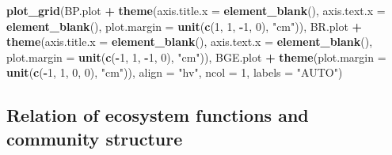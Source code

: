 \documentclass[]{article}
\newenvironment{Shaded}{\begin{snugshade}}{\end{snugshade}}
\newcommand{\KeywordTok}[1]{\textcolor[rgb]{0.13,0.29,0.53}{\textbf{#1}}}
\newcommand{\DataTypeTok}[1]{\textcolor[rgb]{0.13,0.29,0.53}{#1}}
\newcommand{\DecValTok}[1]{\textcolor[rgb]{0.00,0.00,0.81}{#1}}
\newcommand{\StringTok}[1]{\textcolor[rgb]{0.31,0.60,0.02}{#1}}
\newcommand{\OperatorTok}[1]{\textcolor[rgb]{0.81,0.36,0.00}{\textbf{#1}}}
\newcommand{\NormalTok}[1]{#1}
\begin{document}
\begin{Shaded}
\begin{Highlighting}[]
\KeywordTok{plot_grid}\NormalTok{(BP.plot }\OperatorTok{+}\StringTok{ }\KeywordTok{theme}\NormalTok{(}\DataTypeTok{axis.title.x =} \KeywordTok{element_blank}\NormalTok{(), }\DataTypeTok{axis.text.x =} \KeywordTok{element_blank}\NormalTok{(), }
                          \DataTypeTok{plot.margin =} \KeywordTok{unit}\NormalTok{(}\KeywordTok{c}\NormalTok{(}\DecValTok{1}\NormalTok{, }\DecValTok{1}\NormalTok{, }\OperatorTok{-}\DecValTok{1}\NormalTok{, }\DecValTok{0}\NormalTok{), }\StringTok{"cm"}\NormalTok{)), }
\NormalTok{          BR.plot }\OperatorTok{+}\StringTok{ }\KeywordTok{theme}\NormalTok{(}\DataTypeTok{axis.title.x =} \KeywordTok{element_blank}\NormalTok{(), }\DataTypeTok{axis.text.x =} \KeywordTok{element_blank}\NormalTok{(),}
                          \DataTypeTok{plot.margin =} \KeywordTok{unit}\NormalTok{(}\KeywordTok{c}\NormalTok{(}\OperatorTok{-}\DecValTok{1}\NormalTok{, }\DecValTok{1}\NormalTok{, }\OperatorTok{-}\DecValTok{1}\NormalTok{, }\DecValTok{0}\NormalTok{), }\StringTok{"cm"}\NormalTok{)), }
\NormalTok{          BGE.plot }\OperatorTok{+}\StringTok{ }\KeywordTok{theme}\NormalTok{(}\DataTypeTok{plot.margin =} \KeywordTok{unit}\NormalTok{(}\KeywordTok{c}\NormalTok{(}\OperatorTok{-}\DecValTok{1}\NormalTok{, }\DecValTok{1}\NormalTok{, }\DecValTok{0}\NormalTok{, }\DecValTok{0}\NormalTok{), }\StringTok{"cm"}\NormalTok{)), }
          \DataTypeTok{align =} \StringTok{"hv"}\NormalTok{, }\DataTypeTok{ncol =} \DecValTok{1}\NormalTok{, }\DataTypeTok{labels =} \StringTok{"AUTO"}\NormalTok{)}
\end{Highlighting}
\end{Shaded}

\subsection{Relation of ecosystem functions and community
structure}\label{relation-of-ecosystem-functions-and-community-structure}
\end{document}
